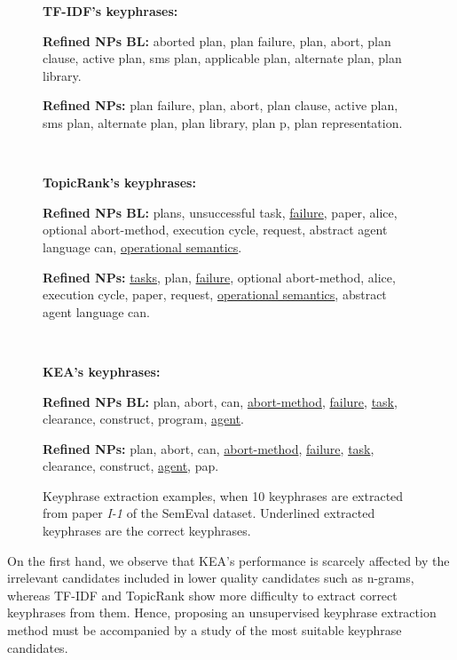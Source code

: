 \begin{figure*}[t]
{{            \textbf{TF-IDF's keyphrases:}

            \setlength\parindent{12pt}
            \textbf{Refined NPs BL:} aborted plan, plan failure, plan, abort,
            plan clause, active plan, sms plan, applicable plan, alternate plan,
            plan library.

            \textbf{Refined NPs:} plan failure, plan, abort, plan clause, active
            plan, sms plan, alternate plan, plan library, plan p, plan
            representation.

            \setlength\parindent{0pt}\dotfill\\\vspace{-0.7em}

            \textbf{TopicRank's keyphrases:}

            \setlength\parindent{12pt}
            \textbf{Refined NPs BL:} plans, unsuccessful task,
            \underline{failure}, paper, alice, optional abort-method, execution
            cycle, request, abstract agent language can, \underline{operational
            semantics}.

            \textbf{Refined NPs:} \underline{tasks}, plan, \underline{failure},
            optional abort-method, alice, execution cycle, paper, request,
            \underline{operational semantics}, abstract agent language can.

            \setlength\parindent{0pt}\dotfill\\\vspace{-0.7em}

            \textbf{KEA's keyphrases:}

            \setlength\parindent{12pt}
            \textbf{Refined NPs BL:} plan, abort, can, \underline{abort-method},
            \underline{failure}, \underline{task}, clearance, construct,
            program, \underline{agent}.

            \textbf{Refined NPs:} plan, abort, can, \underline{abort-method},
            \underline{failure}, \underline{task}, clearance, construct,
            \underline{agent}, pap.
            \setlength\parindent{0pt}
          }
        }
        \caption{Keyphrase extraction examples, when 10 keyphrases are extracted
                 from paper \textit{I-1} of the SemEval dataset. Underlined
                 extracted keyphrases are the correct keyphrases.
                 \label{fig:example}}
      \end{figure*}

      On the first hand, we observe that KEA's performance is scarcely affected
      by the irrelevant candidates included in lower quality candidates such as
      n-grams, whereas TF-IDF and TopicRank show more difficulty to extract
      correct keyphrases from them. Hence, proposing an unsupervised keyphrase
      extraction method must be accompanied by a study of the most suitable
      keyphrase candidates.


